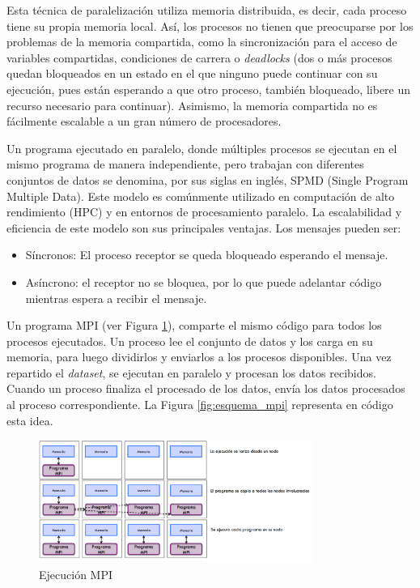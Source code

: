 	\newpage

	Esta técnica de paralelización utiliza memoria distribuida, es decir, cada proceso tiene su propia memoria local. Así, los procesos no tienen que preocuparse por los problemas de la memoria compartida, como la sincronización para el acceso de variables compartidas, condiciones de carrera o \textit{deadlocks} (dos o más procesos quedan bloqueados en un estado en el que ninguno puede continuar con su ejecución, pues están esperando a que otro proceso, también bloqueado, libere un recurso necesario para continuar). Asimismo, la memoria compartida no es fácilmente escalable a un gran número de procesadores\cite{jjruiz2016compartida}.


	Un programa ejecutado en paralelo, donde múltiples procesos se ejecutan en el mismo programa de manera independiente, pero trabajan con diferentes conjuntos de datos se denomina, por sus siglas en inglés, SPMD (Single Program Multiple Data). Este modelo es comúnmente utilizado en computación de alto rendimiento (HPC) y en entornos de procesamiento paralelo. La escalabilidad y eficiencia de este modelo son sus principales ventajas. Los mensajes pueden ser:
	\begin{itemize}
		\item Síncronos: El proceso receptor se queda bloqueado esperando el mensaje.
		\item Asíncrono: el receptor no se bloquea, por lo que puede adelantar código mientras espera a recibir el mensaje.		
	\end{itemize}

	
	Un programa MPI (ver Figura \ref{fig:ejecucion_mpi}), comparte el mismo código para todos los procesos ejecutados. Un proceso lee el conjunto de datos y los carga en su memoria, para luego dividirlos y enviarlos a los procesos disponibles. Una vez repartido el \textit{dataset}, se ejecutan en paralelo y procesan los datos recibidos. Cuando un proceso finaliza el procesado de los datos, envía los datos procesados al proceso correspondiente. La Figura \ref{fig:esquema_mpi} representa en código esta idea.
	
	\vspace{-0.2cm}
	
	\begin{figure}[!h]
		\centering
		\includegraphics[width=0.80\textwidth]{images/chapter_2/mpi_2}
		\caption{Ejecución MPI}
		\label{fig:ejecucion_mpi}
	\end{figure}
	
